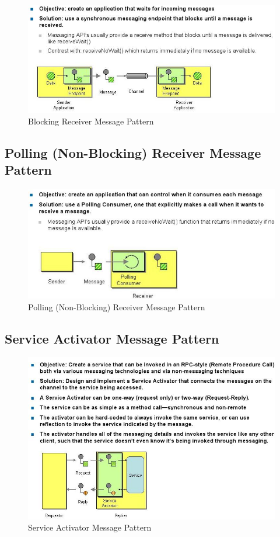 \begin{figure}[h]
	\centering
	\includegraphics[width=0.7\linewidth]{img/pattern_brmp}
	\caption{Blocking Receiver Message Pattern}
	\label{fig:patternbrmp}
\end{figure}

\subsection{Polling (Non-Blocking) Receiver Message Pattern}

\begin{figure}[h]
	\centering
	\includegraphics[width=0.7\linewidth]{img/pattern_polling}
	\caption{Polling (Non-Blocking) Receiver Message Pattern}
	\label{fig:patternpolling}
\end{figure}

\newpage

\subsection{Service Activator Message Pattern}

\begin{figure}[h]
	\centering
	\includegraphics[width=0.7\linewidth]{img/pattern_service_activator}
	\caption{Service Activator Message Pattern}
	\label{fig:patternserviceactivator}
\end{figure}

